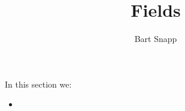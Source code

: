 \documentclass{ximera}
\author{Bart Snapp}
\title{Fields}
\begin{document}
\begin{abstract}
\end{abstract}
\maketitle
In this section we:

\begin{itemize}
\item 
\end{itemize}
\end{document}
